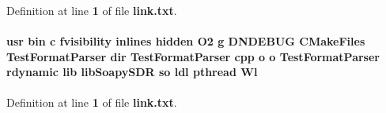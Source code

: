 Definition at line {\bf 1} of file {\bf link.\+txt}.

\paragraph[{Wl}]{\setlength{\rightskip}{0pt plus 5cm}usr bin {\bf c} fvisibility inlines hidden O2 g D\+N\+D\+E\+B\+UG C\+Make\+Files Test\+Format\+Parser dir Test\+Format\+Parser cpp o o Test\+Format\+Parser rdynamic lib lib\+Soapy\+S\+DR {\bf so} ldl {\bf pthread} Wl}\label{soapysdr_2build_2tests_2CMakeFiles_2TestFormatParser_8dir_2link_8txt_a9350547b1e5be0b80822c40a57ce13fe}


Definition at line {\bf 1} of file {\bf link.\+txt}.

